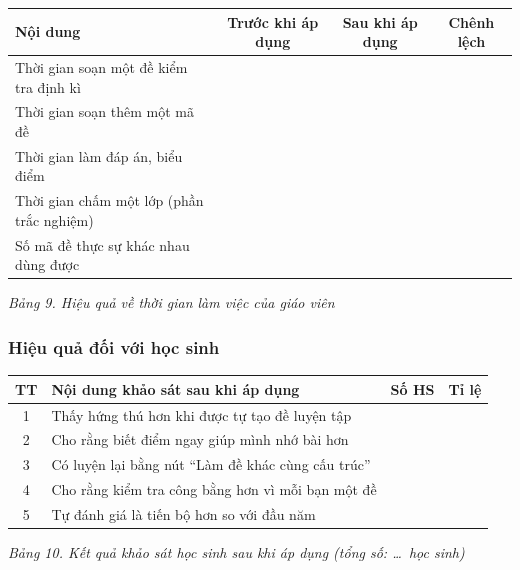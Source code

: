 \begin{center}
\begin{tabular}{|p{6.4cm}|c|c|c|}
\hline
\textbf{Nội dung} & \textbf{Trước khi áp dụng} & \textbf{Sau khi áp dụng} &
\textbf{Chênh lệch} \\ \hline
Thời gian soạn một đề kiểm tra định kì & & & \\ \hline
Thời gian soạn thêm một mã đề & & & \\ \hline
Thời gian làm đáp án, biểu điểm & & & \\ \hline
Thời gian chấm một lớp (phần trắc nghiệm) & & & \\ \hline
Số mã đề thực sự khác nhau dùng được & & & \\ \hline
\end{tabular}
\end{center}
\textit{Bảng 9. Hiệu quả về thời gian làm việc của giáo viên}


\subsubsection{Hiệu quả đối với học sinh}

\begin{center}
\begin{tabular}{|c|p{7.6cm}|c|c|}
\hline
\textbf{TT} & \textbf{Nội dung khảo sát sau khi áp dụng} & \textbf{Số HS} &
\textbf{Tỉ lệ} \\ \hline
1 & Thấy hứng thú hơn khi được tự tạo đề luyện tập & & \\ \hline
2 & Cho rằng biết điểm ngay giúp mình nhớ bài hơn & & \\ \hline
3 & Có luyện lại bằng nút ``Làm đề khác cùng cấu trúc'' & & \\ \hline
4 & Cho rằng kiểm tra công bằng hơn vì mỗi bạn một đề & & \\ \hline
5 & Tự đánh giá là tiến bộ hơn so với đầu năm & & \\ \hline
\end{tabular}
\end{center}
\textit{Bảng 10. Kết quả khảo sát học sinh sau khi áp dụng (tổng số: \dots\ học sinh)}

